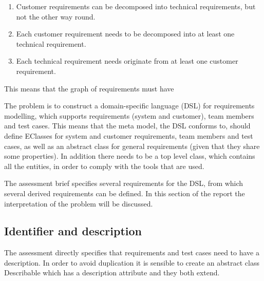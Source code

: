 \documentclass[11pt,a4paper]{scrartcl}
\begin{document}
	\begin{enumerate}
		\item Customer requirements can be decomposed into technical requirements, but not the other way round.
		\item Each customer requirement needs to be decomposed into at least one technical requirement.
		\item Each technical requirement needs originate from at least one customer requirement.
	\end{enumerate}
	
	This means that the graph of requirements must have 
	
	
	\pagebreak
	The problem is to construct a domain-specific language (DSL) for requirements modelling, which supports requirements (system and customer), team members and test cases. This means that the meta model, the DSL conforms to, should define EClasses for system and customer requirements, team members and test cases, as well as an abstract class for general requirements (given that they share some properties). In addition there needs to be a top level class, which contains all the entities, in order to comply with the tools that are used. 
	
	The assessment brief specifies several requirements for the DSL, from which several derived requirements can be defined. In this section of the report the interpretation of the problem will be discussed. 

	\subsection{Identifier and description}
	The assessment directly specifies that requirements and test cases need to have a description. In order to avoid duplication it is sensible to create an abstract class Describable which has a description attribute and they both extend.
	
\end{document}
